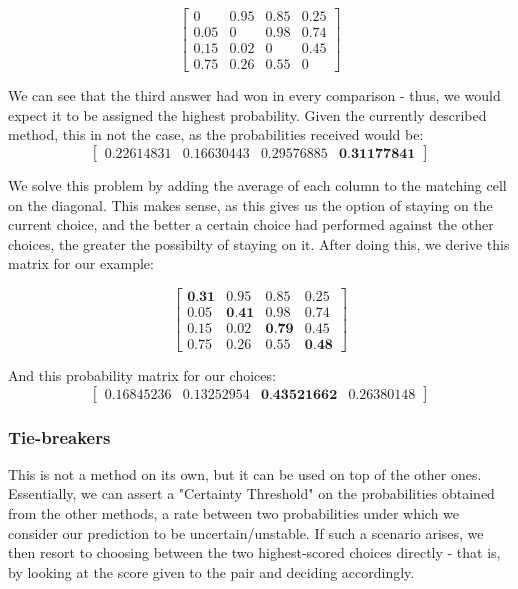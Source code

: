 \documentclass{article}
\begin{document}
$$
\begin{bmatrix}
0 & 0.95 & 0.85 & 0.25 \\
0.05 & 0 & 0.98 & 0.74 \\
0.15 & 0.02 & 0 & 0.45 \\
0.75 & 0.26 & 0.55 & 0
\end{bmatrix}
$$

We can see that the third answer had won in every comparison - thus, we would expect it to be assigned the highest probability. Given the currently described method, this in not the case, as the probabilities received would be:
$$ \begin{bmatrix} 0.22614831 & 0.16630443 & 0.29576885 & \textbf{0.31177841} \end{bmatrix} $$

We solve this problem by adding the average of each column to the matching cell on the diagonal. This makes sense, as this gives us the option of staying on the current choice, and the better a certain choice had performed against the other choices, the greater the possibilty of staying on it.
After doing this, we derive this matrix for our example:

$$
\begin{bmatrix}
\textbf{0.31} & 0.95 & 0.85 & 0.25 \\
0.05 & \textbf{0.41} & 0.98 & 0.74 \\
0.15 & 0.02 & \textbf{0.79} & 0.45 \\
0.75 & 0.26 & 0.55 & \textbf{0.48}
\end{bmatrix}
$$

And this probability matrix for our choices:
$$ \begin{bmatrix} 0.16845236 & 0.13252954 & \textbf{0.43521662} & 0.26380148 \end{bmatrix} $$

\subsubsection{Tie-breakers}

This is not a method on its own, but it can be used on top of the other ones.
Essentially, we can assert a "Certainty Threshold" on the probabilities obtained from the other methods, a rate between two probabilities under which we consider our prediction to be uncertain/unstable.
If such a scenario arises, we then resort to choosing between the two highest-scored choices directly - that is, by looking at the score given to the pair and deciding accordingly.
\end{document}
